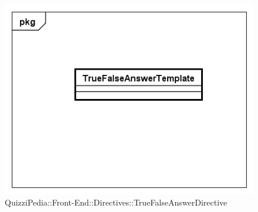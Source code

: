 		\label{QuizziPedia::Front-End::Directives::TrueFalseAnswerDirective}
		
		\begin{figure}[ht]
			\centering
			\includegraphics[scale=0.5,keepaspectratio]{UML/Classi/Front-End/QuizziPedia_Front-end_Templates_TrueFalseAnswerTemplate.png}
			\caption{QuizziPedia::Front-End::Directives::TrueFalseAnswerDirective}
		\end{figure} \FloatBarrier
		
